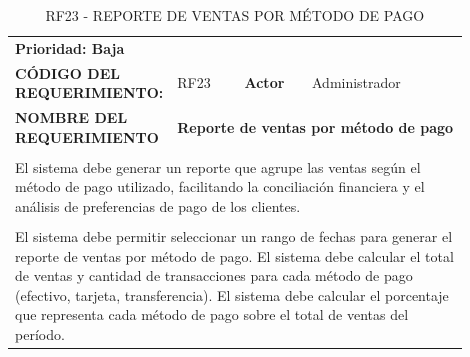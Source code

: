 \begingroup
\renewcommand{\arraystretch}{1.3}
\setlength{\tabcolsep}{6pt}
\centering
\begin{longtable}{|p{0.25\linewidth}|p{0.15\linewidth}|p{0.15\linewidth}|p{0.35\linewidth}|}
\caption{RF23 - REPORTE DE VENTAS POR MÉTODO DE PAGO}\label{tab:rf23}\\
\hline
		\rowcolor{tableheaderblue}
		\multicolumn{4}{|l|}{\textbf{Requerimientos funcionales}}                                                                                                                                    \\ \hline
		\multicolumn{4}{|l|}{\textbf{Prioridad: Baja}}                                                                                                                                               \\ \hline
		\textbf{CÓDIGO DEL REQUERIMIENTO:}                          & RF23                                                               & \cellcolor{tableheaderblue}\textbf{Actor} & Administrador \\ \hline
		\textbf{NOMBRE DEL REQUERIMIENTO}                           & \multicolumn{3}{l|}{\textbf{Reporte de ventas por método de pago}}                                                             \\ \hline
		\rowcolor{tableheaderblue}
		\multicolumn{4}{|l|}{\textbf{Descripción}}                                                                                                                                                   \\ \hline
		\multicolumn{4}{|p{0.96\linewidth}|}{%
		El sistema debe generar un reporte que agrupe las ventas según el método de pago utilizado, facilitando la conciliación financiera y el análisis de preferencias de pago de los clientes.}   \\ \hline
		\rowcolor{tableheaderblue}
		\multicolumn{4}{|l|}{\textbf{Funcionalidad}}                                                                                                                                                 \\ \hline
		\multicolumn{4}{|p{0.96\linewidth}|}{%
		El sistema debe permitir seleccionar un rango de fechas para generar el reporte de ventas por método de pago. \newline
		El sistema debe calcular el total de ventas y cantidad de transacciones para cada método de pago (efectivo, tarjeta, transferencia). \newline
		El sistema debe calcular el porcentaje que representa cada método de pago sobre el total de ventas del período. \newline
}
\end{longtable}
